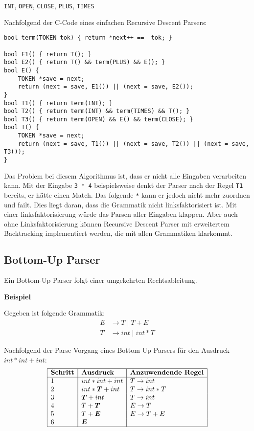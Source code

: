 \texttt{INT}, \texttt{OPEN}, \texttt{CLOSE}, \texttt{PLUS}, \texttt{TIMES}

Nachfolgend der C-Code eines einfachen Recursive Descent Parsers:

\begin{verbatim}
bool term(TOKEN tok) { return *next++ ==  tok; }

bool E1() { return T(); }
bool E2() { return T() && term(PLUS) && E(); }
bool E() {
    TOKEN *save = next;
    return (next = save, E1()) || (next = save, E2());
}
bool T1() { return term(INT); }
bool T2() { return term(INT) && term(TIMES) && T(); }
bool T3() { return term(OPEN) && E() && term(CLOSE); }
bool T() {
    TOKEN *save = next;
    return (next = save, T1()) || (next = save, T2()) || (next = save, T3());
}
\end{verbatim}

Das Problem bei diesem Algorithmus ist, dass er nicht alle Eingaben verarbeiten
kann. Mit der Eingabe \texttt{3 * 4} beispielsweise denkt der Parser nach der
Regel \texttt{T1} bereits, er hätte einen Match. Das folgende \texttt{*} kann er
jedoch nicht mehr zuordnen und failt. Dies liegt daran, dass die Grammatik nicht
linksfaktorisiert ist. Mit einer linksfaktorisierung würde das Parsen aller
Eingaben klappen. Aber auch ohne Linksfaktorisierung können Recursive Descent
Parser mit erweitertem Backtracking implementiert werden, die mit allen
Grammatiken klarkommt.


\subsection{Bottom-Up Parser} 

Ein Bottom-Up Parser folgt einer umgekehrten Rechtsableitung.

\textbf{Beispiel}

Gegeben ist folgende Grammatik:
%
\begin{align*}
	E &\rightarrow T \mid T + E \\
	T &\rightarrow int \mid int * T
\end{align*}

Nachfolgend der Parse-Vorgang eines Bottom-Up Parsers für den Ausdruck $int * int + int$:
\[
	\begin{array}{|l|l|l|}
		\hline
		\textbf{Schritt} & \textbf{Ausdruck} & \textbf{Anzuwendende Regel} \\
		\hline
		1 & int * int + int & T \rightarrow int \\
		2 & int * \boldsymbol T + int & T \rightarrow int * T \\
		3 & \boldsymbol T + int & T \rightarrow int \\
		4 & T + \boldsymbol T & E \rightarrow T \\
		5 & T + \boldsymbol E & E \rightarrow T + E \\
		6 & \boldsymbol E & \\
		\hline
	\end{array}
\]

